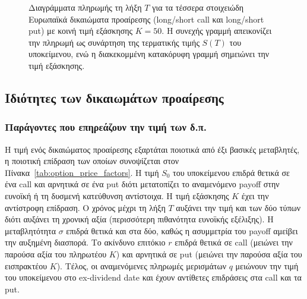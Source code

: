 \documentclass[12pt]{article}
\begin{document}
\begin{figure}[H]
\caption{Διαγράμματα πληρωμής τη λήξη $T$ για τα τέσσερα στοιχειώδη Ευρωπαϊκά δικαιώματα προαίρεσης (long/short call και long/short put) με κοινή τιμή εξάσκησης $K = 50$. Η συνεχής γραμμή απεικονίζει την πληρωμή ως συνάρτηση της τερματικής τιμής $S(T)$ του υποκείμενου, ενώ η διακεκομμένη κατακόρυφη γραμμή σημειώνει την τιμή εξάσκησης.}
\label{fig:basic_options}
\end{figure}

\subsection{Ιδιότητες των δικαιωμάτων προαίρεσης}

\subsubsection{Παράγοντες που επηρεάζουν την τιμή των δ.π.}

Η τιμή ενός δικαιώματος προαίρεσης εξαρτάται ποιοτικά από έξι βασικές μεταβλητές, η ποιοτική επίδραση των οποίων συνοψίζεται στον Πίνακα~\ref{tab:option_price_factors}. Η τιμή $S_0$ του υποκείμενου επιδρά θετικά σε ένα call και αρνητικά σε ένα put διότι μετατοπίζει το αναμενόμενο payoff στην ευνοϊκή ή τη δυσμενή κατεύθυνση αντίστοιχα. Η τιμή εξάσκησης $K$ έχει την αντίστροφη επίδραση. Ο χρόνος μέχρι τη λήξη $T$ αυξάνει την τιμή και των δύο τύπων διότι αυξάνει τη χρονική αξία (περισσότερη πιθανότητα ευνοϊκής εξέλιξης). Η μεταβλητότητα $\sigma$ επιδρά θετικά και στα δύο, καθώς η ασυμμετρία του payoff αμείβει την αυξημένη διασπορά. Το ακίνδυνο επιτόκιο $r$ επιδρά θετικά σε call (μειώνει την παρούσα αξία του πληρωτέου $K$) και αρνητικά σε put (μειώνει την παρούσα αξία του εισπρακτέου $K$). Τέλος, οι αναμενόμενες πληρωμές μερισμάτων $q$ μειώνουν την τιμή του υποκείμενου στο ex-dividend date και έχουν αντίθετες επιδράσεις στα call και τα put.
\end{document}
